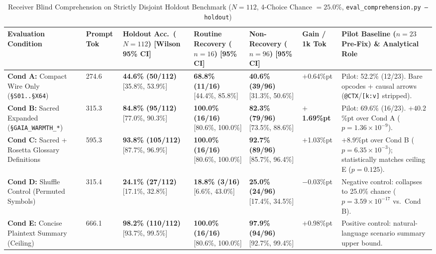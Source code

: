 \documentclass[9pt,a4paper]{extarticle}
\begin{document}
\begin{table}[h!]
\centering
\caption{Receiver Blind Comprehension on Strictly Disjoint Holdout Benchmark ($N = 112$, 4-Choice Chance $= 25.0\%$, \texttt{eval\_comprehension.py --holdout})}
\label{tab:comprehension_results}
\footnotesize
\renewcommand{\arraystretch}{0.96}
\setlength{\tabcolsep}{2.5pt}
\begin{tabularx}{\textwidth}{L{3.4cm} R{1.2cm} C{2.3cm} C{2.1cm} C{2.1cm} R{1.4cm} Y}
\toprule
{}
\textbf{\color{white}Evaluation Condition} &
\textbf{\color{white}Prompt Tok} &
\textbf{\color{white}Holdout Acc.\ ($N=112$) [Wilson 95\% CI]} &
\textbf{\color{white}Routine Recovery ($n=16$) [95\% CI]} &
\textbf{\color{white}Non-Recovery ($n=96$) [95\% CI]} &
\textbf{\color{white}Gain / 1k Tok} &
\textbf{\color{white}Pilot Baseline ($n=23$ Pre-Fix) \& Analytical Role} \\
\midrule
\textbf{Cond A:} Compact Wire Only (\texttt{\S S01..\S X64}) & 274.6 & \textbf{44.6\% (50/112)} [35.8\%, 53.9\%] & \textbf{68.8\% (11/16)} [44.4\%, 85.8\%] & \textbf{40.6\% (39/96)} [31.3\%, 50.6\%] & $+$0.64\%pt & Pilot: 52.2\% (12/23). Bare opcodes + causal arrows (\texttt{@CTX}/\texttt{[k:v]} stripped). \\
\textbf{Cond B:} Sacred Expanded (\texttt{\S GAIA\_WARMTH\_*}) & 315.3 & \textbf{84.8\% (95/112)} [77.0\%, 90.3\%] & \textbf{100.0\% (16/16)} [80.6\%, 100.0\%] & \textbf{82.3\% (79/96)} [73.5\%, 88.6\%] & \textbf{$+$1.69\%pt} & Pilot: 69.6\% (16/23). $+40.2$\%pt over Cond A ($p = 1.36 \times 10^{-9}$). \\
\textbf{Cond C:} Sacred + Rosetta Glossary Definitions & 595.3 & \textbf{93.8\% (105/112)} [87.7\%, 96.9\%] & \textbf{100.0\% (16/16)} [80.6\%, 100.0\%] & \textbf{92.7\% (89/96)} [85.7\%, 96.4\%] & $+$1.03\%pt & $+8.9$\%pt over Cond B ($p = 6.35 \times 10^{-3}$); statistically matches ceiling E ($p=0.125$). \\
\textbf{Cond D:} Shuffle Control (Permuted Symbols) & 315.4 & \textbf{24.1\% (27/112)} [17.1\%, 32.8\%] & \textbf{18.8\% (3/16)} [6.6\%, 43.0\%] & \textbf{25.0\% (24/96)} [17.4\%, 34.5\%] & $-$0.03\%pt & Negative control: collapses to 25.0\% chance ($p = 3.59 \times 10^{-17}$ vs.\ Cond B). \\
\textbf{Cond E:} Concise Plaintext Summary (Ceiling) & 666.1 & \textbf{98.2\% (110/112)} [93.7\%, 99.5\%] & \textbf{100.0\% (16/16)} [80.6\%, 100.0\%] & \textbf{97.9\% (94/96)} [92.7\%, 99.4\%] & $+$0.98\%pt & Positive control: natural-language scenario summary upper bound. \\
\bottomrule
\end{tabularx}
\end{table}
\end{document}
